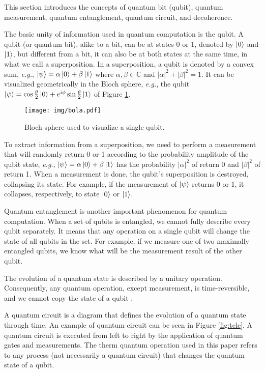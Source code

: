 \documentclass[preprint,3p,times,twocolumn]{elsarticle}
\begin{document}
This section introduces the concepts of quantum bit
(qubit), quantum measurement, quantum entanglement, quantum circuit, and
decoherence.

The basic unity of information used in quantum computation is the qubit. A
qubit (or quantum bit), alike to a bit, can be at states 0 or 1, denoted by
$\ket0$ and $\ket1$, but different from a bit, it can also be at both states at
the same time, in what we call a superposition. In a superposition, a qubit is
denoted by a convex sum,  \textit{e.g.}, $\ket\psi = \alpha\ket0+\beta\ket1$
where $\alpha, \beta \in \mathbb{C}$ and $|\alpha|^2+|\beta|^2 = 1$. It can be
visualized geometrically in the Bloch sphere, \textit{e.g.}, the qubit
$\ket\psi = \cos\frac{\theta}{2}\ket0 + e^{i\phi}\sin\frac{\theta}{2}\ket1$ of
Figure \ref{fig:bola}.

\begin{figure}[h]
    \centering
    \texttt{[image: img/bola.pdf]}
    \caption{Bloch sphere used to visualize a single qubit.}
    \label{fig:bola}
\end{figure}

To extract information from a superposition, we need to perform a measurement
that will randomly return 0 or 1 according to the probability amplitude of the
qubit state, \textit{e.g.}, $\ket\psi = \alpha\ket0+\beta\ket1$ has the
probability $|\alpha|^2$ of return 0 and $|\beta|^2$ of return 1. When a
measurement is done, the qubit's superposition is destroyed, collapsing its
state. For example, if the measurement of $\ket\psi$ returns 0 or 1, it
collapses, respectively, to state $\ket0$ or $\ket1$.

Quantum entanglement is another important phenomenon for quantum computation.
When a set of qubits is entangled, we cannot fully describe every qubit
separately. It means that any operation on a single qubit will change the state
of all qubits in the set. For example, if we measure one of two maximally
entangled qubits, we know what will be the measurement result of the other
qubit.

The evolution of a quantum state is described by a unitary operation.
Consequently, any quantum operation, except measurement, is time-reversible,
and we cannot copy the state of a qubit \cite{Wootters1982}.  

A quantum circuit \cite{Nielsen2012} is a diagram that defines the evolution of
a quantum state through time. An example of quantum circuit can be seen in
Figure \ref{fig:tele}. A quantum circuit is executed from left to right by the
application of quantum gates and measurements. The therm quantum operation used
in this paper refers to any process (not necessarily a quantum circuit) that
changes the quantum state of a qubit.
\end{document}
